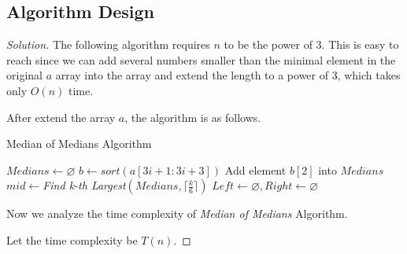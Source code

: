 \documentclass{article}
\newenvironment{solution}{\begin{proof}[\noindent\it Solution]}{\end{proof}}
\begin{document}
\vspace{0.5em}
\subsection{Algorithm Design}
\vspace{1em}
\begin{solution}
    The following algorithm requires $n$ to be the power of 3. This is easy to reach since we can add several numbers smaller than the minimal element in the original $a$ array into the array and extend the length to a power of 3, which takes only $O(n)$ time.
    
    \hspace{2.5em}
    After extend the array $a$, the algorithm is as follows.
    
    \begin{algorithm}
        \caption{Median of Medians Algorithm}

	    {
	         
	        \BlankLine
	        \BlankLine
	        \BlankLine
	        $Medians\gets\varnothing$\;
	        {
	            $b\gets sort\left(a[3i+1:3i+3]\right)$\;
	            Add element $b[2]$ into $Medians$\;
	        }
	        $mid\gets$\textit{Find k-th Largest}$\left(Medians,\lceil\frac{k}{6}\rceil\right)$\;
	        \BlankLine
	        \BlankLine
	        \BlankLine
	        $Left\gets\varnothing, Right\gets\varnothing$\;
	        {
	        }
	    }
    \end{algorithm}
    
    \hspace{2.5em}
    Now we analyze the time complexity of \textit{Median of Medians} Algorithm. 
    
    \hspace{2.5em}
    Let the time complexity be $T(n)$. 
    

\end{solution}
\end{document}
